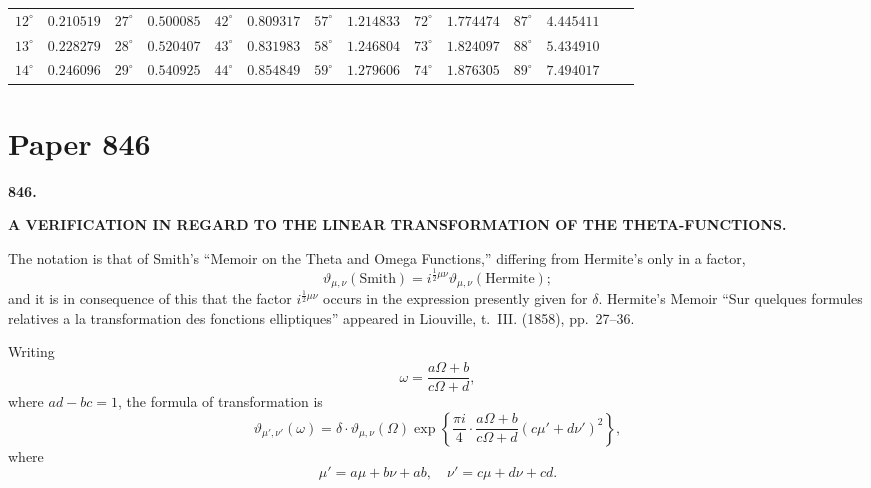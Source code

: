 \documentclass[11pt,a4paper]{article}
\theoremstyle{definition}
\begin{document}
\begin{center}
\begin{tabular}{r|r|r|r|r|r|r|r|r|r|r|r|r|r}
$12^\circ$ & $0.210519$ & $27^\circ$ & $0.500085$ & $42^\circ$ & $0.809317$ & $57^\circ$ & $1.214833$ & $72^\circ$ & $1.774474$ & $87^\circ$ & $4.445411$ & & \\
$13^\circ$ & $0.228279$ & $28^\circ$ & $0.520407$ & $43^\circ$ & $0.831983$ & $58^\circ$ & $1.246804$ & $73^\circ$ & $1.824097$ & $88^\circ$ & $5.434910$ & & \\
$14^\circ$ & $0.246096$ & $29^\circ$ & $0.540925$ & $44^\circ$ & $0.854849$ & $59^\circ$ & $1.279606$ & $74^\circ$ & $1.876305$ & $89^\circ$ & $7.494017$ & & \\
\hline
\end{tabular}
\end{center}

\newpage

\section{Paper 846}

\begin{center}
\large\textbf{846.}

\Large\textbf{A VERIFICATION IN REGARD TO THE LINEAR TRANSFORMATION OF THE THETA-FUNCTIONS.}

\end{center}

\bigskip

The notation is that of Smith's ``Memoir on the Theta and Omega Functions,'' differing from Hermite's only in a factor,
\[
\vartheta_{\mu,\nu}(\text{Smith}) = i^{\frac{1}{2}\mu\nu}\vartheta_{\mu,\nu}(\text{Hermite});
\]
and it is in consequence of this that the factor $i^{\frac{1}{2}\mu\nu}$ occurs in the expression presently given for $\delta$. Hermite's Memoir ``Sur quelques formules relatives a la transformation des fonctions elliptiques'' appeared in Liouville, t.~III. (1858), pp.~27--36.

Writing
\[
\omega = \frac{a\Omega + b}{c\Omega + d},
\]
where $ad - bc = 1$, the formula of transformation is
\[
\vartheta_{\mu',\nu'}(\omega) = \delta \cdot \vartheta_{\mu,\nu}(\Omega) \exp\left\{\frac{\pi i}{4}\cdot\frac{a\Omega + b}{c\Omega + d}(c\mu' + d\nu')^2\right\},
\]
where
\[
\mu' = a\mu + b\nu + ab, \quad \nu' = c\mu + d\nu + cd.
\]
\end{document}
